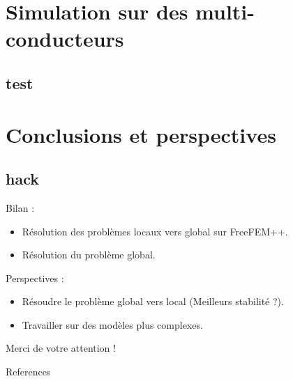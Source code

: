 \documentclass[compress, hyperref={unicode, bookmarks=true}]{beamer}
\begin{document}
\section[Simulations]{Simulation sur des multi-conducteurs}
\subsection{test}






\section{Conclusions et perspectives}
\subsection{hack}
\begin{frame}
  Bilan :
  \begin{itemize}
    \item Résolution des problèmes locaux vers global sur FreeFEM++.
    \item Résolution du problème global.
  \end{itemize}
  \vspace{1cm}
  \pause
  Perspectives :
  \begin{itemize}
    \item Résoudre le problème global vers local (Meilleurs stabilité ?).
    \item Travailler sur des modèles plus complexes.
  \end{itemize}
\end{frame}


\begin{frame}
\begin{center}
\Huge Merci de votre attention !
\end{center}
\end{frame}


\begin{frame}[allowframebreaks]{References}
  \vspace{-0.05\textheight}
  \scriptsize
  
  
\end{frame}

\tiny

\end{document}
